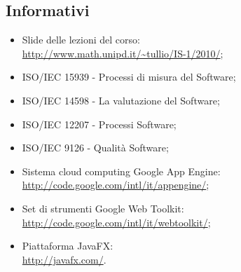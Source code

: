 \subsection{Informativi}
\begin{itemize}
  \item Slide delle lezioni del corso:\\
  \url{http://www.math.unipd.it/~tullio/IS-1/2010/};
  \item ISO/IEC 15939 - Processi di misura del Software;
  \item ISO/IEC 14598 - La valutazione del Software;
  \item ISO/IEC 12207 - Processi Software;
  \item ISO/IEC 9126 - Qualit\`a Software;
  \item Sistema cloud computing Google App Engine:\\
  \url{http://code.google.com/intl/it/appengine/};
  \item Set di strumenti Google Web Toolkit:\\
  \url{http://code.google.com/intl/it/webtoolkit/};
  \item Piattaforma JavaFX:\\
  \url{http://javafx.com/}.
\end{itemize}
